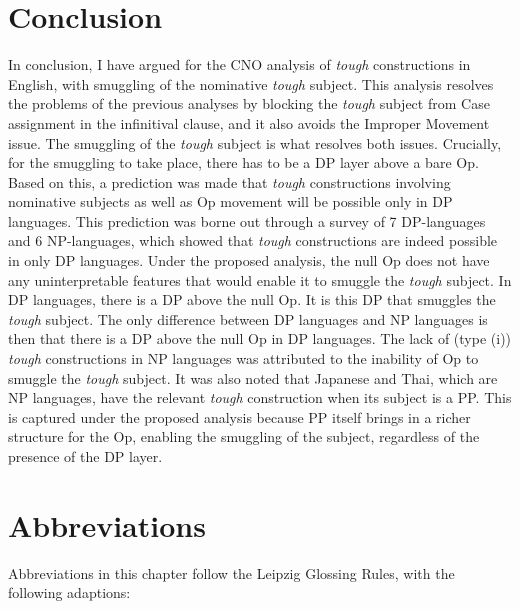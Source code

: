 \documentclass[output=paper,colorlinks,citecolor=brown,
]{langscibook}
\begin{document}
\section{Conclusion} \label{s4ha}
In conclusion, I have argued for the CNO analysis \citep{Hicks2009} of \textit{tough} constructions in English, with smuggling of the nominative \textit{tough} subject. This analysis resolves the problems of the previous analyses by blocking the \textit{tough} subject from Case assignment in the infinitival clause, and it also avoids the Improper Movement issue. The smuggling of the \textit{tough} subject is what resolves both issues. Crucially, for the smuggling to take place, there has to be a DP layer above a bare Op. Based on this, a prediction was made that \textit{tough} constructions involving nominative subjects as well as Op movement will be possible only in DP languages. This prediction was borne out through a survey of 7 DP-languages and 6 NP-languages, which showed that \textit{tough} constructions are indeed possible in only DP languages. Under the proposed analysis, the null Op does not have any uninterpretable features that would enable it to smuggle the \textit{tough} subject. In DP languages, there is a DP above the null Op. It is this DP that smuggles the \textit{tough} subject. The only difference between DP languages and NP languages is then that there is a DP above the null Op in DP languages. The lack of (type (i)) \textit{tough} constructions in NP languages was attributed to the inability of Op to smuggle the \textit{tough} subject. It was also noted that Japanese and Thai, which are NP languages, have the relevant \textit{tough} construction when its subject is a PP. This is captured under the proposed analysis because PP itself brings in a richer structure for the Op, enabling the smuggling of the subject, regardless of the presence of the DP layer. 

\section*{Abbreviations}

Abbreviations in this chapter follow the Leipzig Glossing Rules, with the following adaptions:
\end{document}
